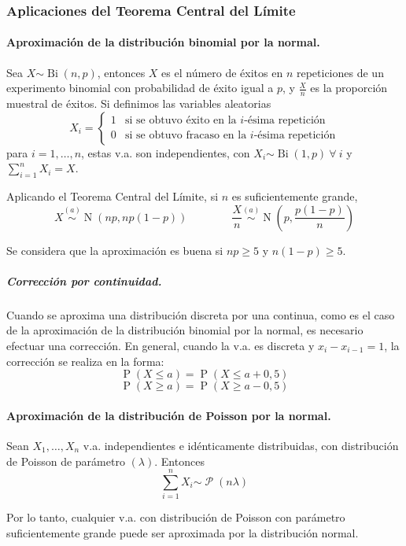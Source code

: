 \documentclass[11pt]{article}
\theoremstyle{plain}
\theoremstyle{definition}
\theoremstyle{remark}
\newcommand{\proba}{\ensuremath{\operatorname{P}}}  %
\newcommand{\foralle}{\ensuremath{\forall \ }}  %
\newcommand{\dist}[1]{\ensuremath{\sim \operatorname{#1}}}  %
\newcommand{\distt}[2]{\ensuremath{\overset{#1}{\sim} \operatorname{#2}}}  %
\newcommand{\poisson}[0]{\ensuremath{\mathcal{P}}}  %
\begin{document}
    \subsubsection{Aplicaciones del Teorema Central del Límite}

      \paragraph{Aproximación de la distribución binomial por la normal.}
      Sea $X \dist{Bi}(n,p)$, entonces $X$ es el número de éxitos en $n$ repeticiones de un experimento binomial con probabilidad de éxito igual a $p$, y $\frac{X}{n}$ es la proporción muestral de éxitos. Si definimos las variables aleatorias
      \[ X_i = \begin{cases}
        1 & \text{si se obtuvo éxito en la $i$-ésima repetición} \\
        0 & \text{si se obtuvo fracaso en la $i$-ésima repetición}
      \end{cases} \]
      para $i = 1,\dots,n$, estas v.a. son independientes, con $X_i \dist{Bi}(1,p) \ \foralle i$ y $\sum_{i=1}^n X_i = X$.

      Aplicando el Teorema Central del Límite, si $n$ es suficientemente grande,
      \[ X \distt{(a)}{N}(np, np(1 - p)) \qquad \qquad \frac{X}{n} \distt{(a)}{N}\left( p,\frac{p(1-p)}{n} \right) \]

      Se considera que la aproximación es buena si $np \geq 5$ y $n(1-p) \geq 5$.

      \subparagraph{Corrección por continuidad.}
      Cuando se aproxima una distribución discreta por una continua, como es el caso de la aproximación de la distribución binomial por la normal, es necesario efectuar una corrección. En general, cuando la v.a. es discreta y $x_i - x_{i-1} = 1$, la corrección se realiza en la forma:
      \[ \proba(X \leq a) = \proba(X \leq a + 0,5) \]
      \[ \proba(X \geq a) = \proba(X \geq a - 0,5) \]

      \paragraph{Aproximación de la distribución de Poisson por la normal.}
      Sean $X_1, \dots, X_n$ v.a. independientes e idénticamente distribuidas, con distribución de Poisson de parámetro $(\lambda)$. Entonces
      \[ \sum_{i=1}^n X_i \dist{\poisson}(n \lambda) \]

      Por lo tanto, cualquier v.a. con distribución de Poisson con parámetro suficientemente grande puede ser aproximada por la distribución normal.
\end{document}
